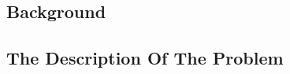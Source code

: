 \documentclass[../main]{subfiles}
\begin{document}
\subsection{Background}
\subsection{The Description Of The Problem}
\end{document}
